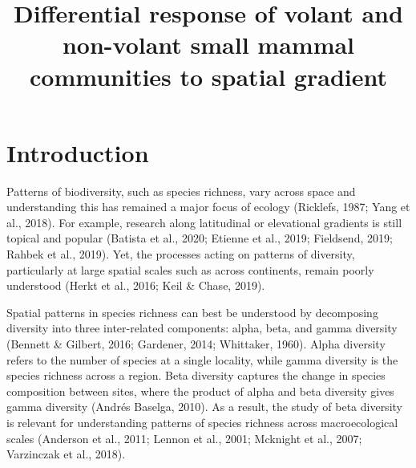 \documentclass{article}
\begin{document}
\title{Differential response of volant and non-volant small mammal communities to spatial gradient}
\begin{titlepage}
\maketitle
\end{titlepage}






\section{Introduction}
Patterns of biodiversity, such as species richness, vary across space and understanding this has remained a major focus of ecology (Ricklefs, 1987; Yang et al., 2018). For example, research along latitudinal or elevational gradients is still topical and popular (Batista et al., 2020; Etienne et al., 2019; Fieldsend, 2019; Rahbek et al., 2019). Yet, the processes acting on patterns of diversity, particularly at large spatial scales such as across continents, remain poorly understood (Herkt et al., 2016; Keil \& Chase, 2019). 

\vspace{5mm}


\vspace{5mm}


Spatial patterns in species richness can best be understood by decomposing diversity into three inter-related components: alpha, beta, and gamma diversity (Bennett \& Gilbert, 2016; Gardener, 2014; Whittaker, 1960). Alpha diversity refers to the number of species at a single locality, while gamma diversity is the species richness across a region. Beta diversity captures the change in species composition between sites, where the product of alpha and beta diversity gives gamma diversity (Andrés Baselga, 2010). As a result, the study of beta diversity is relevant for understanding patterns of species richness across macroecological scales (Anderson et al., 2011; Lennon et al., 2001; Mcknight et al., 2007; Varzinczak et al., 2018). 
\end{document}
